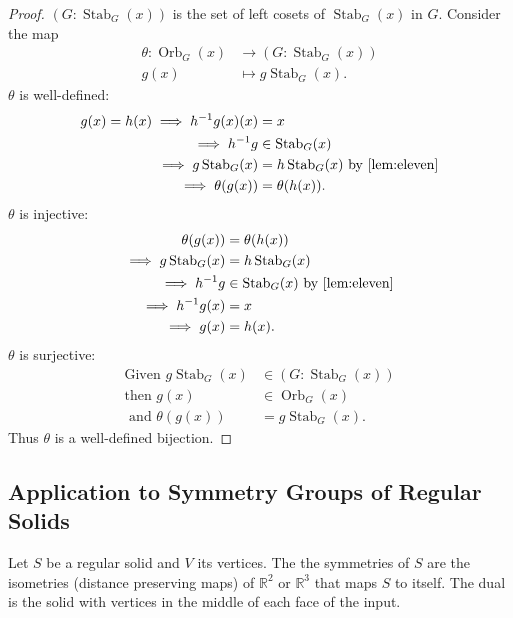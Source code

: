 \begin{proof}
    $(G : \operatorname{Stab}_G(x))$ is the set of left cosets of $\operatorname{Stab}_G(x)$ in $G$.
    Consider the map 
    \begin{align*}
        \theta : \operatorname{Orb}_G(x) &\to (G : \operatorname{Stab}_G(x)) \\
        g(x) &\mapsto g \operatorname{Stab}_G(x).
    \end{align*}  
    $\theta$ is well-defined: 
    \begin{align*}
        g(x) = h(x) \implies h^{-1}g(x) (x) &= x \\
        \implies h^{-1}g &\in \operatorname{Stab}_G(x) \\
        \implies g \operatorname{Stab}_G(x) &= h \operatorname{Stab}_G(x) \text{ by \Cref{lem:eleven}} \\
        \implies \theta(g(x)) &= \theta(h(x)).
    \end{align*} 
    $\theta$ is injective: 
    \begin{align*}
        \theta(g(x)) &= \theta(h(x)) \\
        \implies g \operatorname{Stab}_G(x) &= h \operatorname{Stab}_G(x) \\
        \implies h^{-1}g &\in \operatorname{Stab}_G(x) \text{ by \Cref{lem:eleven}} \\
        \implies h^{-1}g(x) &= x \\
        \implies g(x) &= h(x).
    \end{align*}
    $\theta$ is surjective:
    \begin{align*}
        \text{Given } g \operatorname{Stab}_G(x) &\in (G : \operatorname{Stab}_G(x)) \\
        \text{then } g(x) &\in \operatorname{Orb}_G(x) \\
        \text{ and } \theta(g(x)) &= g \operatorname{Stab}_G(x).
    \end{align*} 
    Thus $\theta$ is a well-defined bijection.
\end{proof} 

\subsection{Application to Symmetry Groups of Regular Solids}
Let $S$ be a regular solid and $V$ its vertices.
The the symmetries of $S$ are the isometries (distance preserving maps) of $\mathbb{R}^2$ or $\mathbb{R}^3$ that maps $S$ to itself.
The dual is the solid with vertices in the middle of each face of the input.

